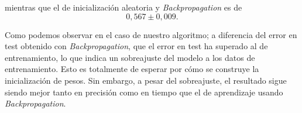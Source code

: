 mientras que el de inicialización aleatoria y \textit{Backpropagation} es de 
\begin{equation}
    0,567 \pm 0,009.
\end{equation}


Como podemos observar en el caso de nuestro 
algoritmo; a diferencia del error en test obtenido con \textit{Backpropagation}, que el error en test ha superado al de entrenamiento, lo que indica un sobreajuste 
del modelo a los datos de entrenamiento. Esto es totalmente de esperar por 
cómo se construye la inicialización de pesos. Sin embargo, a pesar del sobreajuste, el resultado sigue siendo mejor tanto en precisión como en tiempo que el de aprendizaje usando \textit{Backpropagation}.  



\newpage

